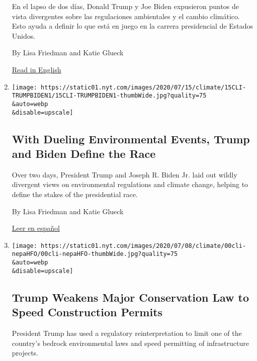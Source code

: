 \begin{enumerate}
  En el lapso de dos días, Donald Trump y Joe Biden expusieron puntos de
  vista divergentes sobre las regulaciones ambientales y el cambio
  climático. Esto ayuda a definir lo que está en juego en la carrera
  presidencial de Estados Unidos.

  By Lisa Friedman and Katie Glueck

  \href{https://www.nytimes.com/2020/07/15/climate/trump-biden-environment.html}{Read
  in English}
\item
  \href{/2020/07/15/climate/trump-biden-environment.html}{}

  \texttt{[image: https://static01.nyt.com/images/2020/07/15/climate/15CLI-TRUMPBIDEN1/15CLI-TRUMPBIDEN1-thumbWide.jpg?quality=75\\\&auto=webp\\\&disable=upscale]}

  \hypertarget{with-dueling-environmental-events-trump-and-biden-define-the-race}{%
  \subsection{With Dueling Environmental Events, Trump and Biden Define
  the
  Race}\label{with-dueling-environmental-events-trump-and-biden-define-the-race}}

  Over two days, President Trump and Joseph R. Biden Jr. laid out wildly
  divergent views on environmental regulations and climate change,
  helping to define the stakes of the presidential race.

  By Lisa Friedman and Katie Glueck

  \href{https://www.nytimes.com/es/2020/07/17/espanol/estados-unidos/cambio-climatico-trump-biden.html}{Leer
  en español}
\item
  \href{/2020/07/15/climate/trump-environment-nepa.html}{}

  \texttt{[image: https://static01.nyt.com/images/2020/07/08/climate/00cli-nepaHFO/00cli-nepaHFO-thumbWide.jpg?quality=75\\\&auto=webp\\\&disable=upscale]}

  \hypertarget{trump-weakens-major-conservation-law-to-speed-construction-permits}{%
  \subsection{Trump Weakens Major Conservation Law to Speed Construction
  Permits}\label{trump-weakens-major-conservation-law-to-speed-construction-permits}}

  President Trump has used a regulatory reinterpretation to limit one of
  the country's bedrock environmental laws and speed permitting of
  infrastructure projects.


\end{enumerate}
